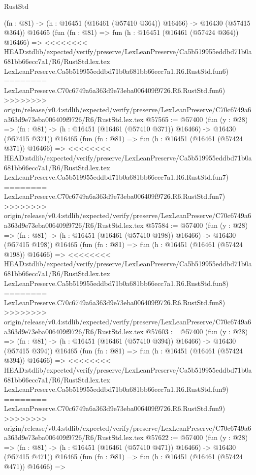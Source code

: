 \begin{lexlean}{RustStd}
\begin{coremodule}
{\begin{coremodule}
{{{{{{{{{{{{{{{{{{{{{{{{{{{{{{{{{{{{{{{{{{{{{{{{{{{{{{{    (fn : @81) -> (h : @16451 (@16461 (@57410 @364)) @16466) -> @16430 (@57415 @364))
    @16465
    (fun (fn : @81) =>
    fun (h : @16451 (@16461 (@57424 @364)) @16466) =>
<<<<<<<< HEAD:stdlib/expected/verify/preserve/LexLeanPreserve/Ca5b519955eddbd71b0a681bb66ecc7a1/R6/RustStd.lex.tex
    LexLeanPreserve.Ca5b519955eddbd71b0a681bb66ecc7a1.R6.RustStd.fun6)
========
    LexLeanPreserve.C70c6749a6a363d9e73eba006409f9726.R6.RustStd.fun6)
>>>>>>>> origin/release/v0.4:stdlib/expected/verify/preserve/LexLeanPreserve/C70c6749a6a363d9e73eba006409f9726/R6/RustStd.lex.tex
@57565 := @57400
    (fun (y : @28) =>
    (fn : @81) -> (h : @16451 (@16461 (@57410 @371)) @16466) -> @16430 (@57415 @371))
    @16465
    (fun (fn : @81) =>
    fun (h : @16451 (@16461 (@57424 @371)) @16466) =>
<<<<<<<< HEAD:stdlib/expected/verify/preserve/LexLeanPreserve/Ca5b519955eddbd71b0a681bb66ecc7a1/R6/RustStd.lex.tex
    LexLeanPreserve.Ca5b519955eddbd71b0a681bb66ecc7a1.R6.RustStd.fun7)
========
    LexLeanPreserve.C70c6749a6a363d9e73eba006409f9726.R6.RustStd.fun7)
>>>>>>>> origin/release/v0.4:stdlib/expected/verify/preserve/LexLeanPreserve/C70c6749a6a363d9e73eba006409f9726/R6/RustStd.lex.tex
@57584 := @57400
    (fun (y : @28) =>
    (fn : @81) -> (h : @16451 (@16461 (@57410 @198)) @16466) -> @16430 (@57415 @198))
    @16465
    (fun (fn : @81) =>
    fun (h : @16451 (@16461 (@57424 @198)) @16466) =>
<<<<<<<< HEAD:stdlib/expected/verify/preserve/LexLeanPreserve/Ca5b519955eddbd71b0a681bb66ecc7a1/R6/RustStd.lex.tex
    LexLeanPreserve.Ca5b519955eddbd71b0a681bb66ecc7a1.R6.RustStd.fun8)
========
    LexLeanPreserve.C70c6749a6a363d9e73eba006409f9726.R6.RustStd.fun8)
>>>>>>>> origin/release/v0.4:stdlib/expected/verify/preserve/LexLeanPreserve/C70c6749a6a363d9e73eba006409f9726/R6/RustStd.lex.tex
@57603 := @57400
    (fun (y : @28) =>
    (fn : @81) -> (h : @16451 (@16461 (@57410 @394)) @16466) -> @16430 (@57415 @394))
    @16465
    (fun (fn : @81) =>
    fun (h : @16451 (@16461 (@57424 @394)) @16466) =>
<<<<<<<< HEAD:stdlib/expected/verify/preserve/LexLeanPreserve/Ca5b519955eddbd71b0a681bb66ecc7a1/R6/RustStd.lex.tex
    LexLeanPreserve.Ca5b519955eddbd71b0a681bb66ecc7a1.R6.RustStd.fun9)
========
    LexLeanPreserve.C70c6749a6a363d9e73eba006409f9726.R6.RustStd.fun9)
>>>>>>>> origin/release/v0.4:stdlib/expected/verify/preserve/LexLeanPreserve/C70c6749a6a363d9e73eba006409f9726/R6/RustStd.lex.tex
@57622 := @57400
    (fun (y : @28) =>
    (fn : @81) -> (h : @16451 (@16461 (@57410 @471)) @16466) -> @16430 (@57415 @471))
    @16465
    (fun (fn : @81) =>
    fun (h : @16451 (@16461 (@57424 @471)) @16466) =>
}}}}}}}}}}}}}}}}}}}}}}}}}}}}}}}}}}}}}}}}}}}}}}}}}}}}}}}
\end{coremodule}}
\end{coremodule}
\end{lexlean}
